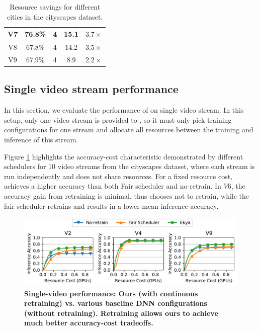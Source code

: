 \begin{table}[]
\begin{tabular}{|c|c|c|c|c|}
V7                                                                      & 76.8\%                    & 4           & 15.1                 & $3.7\times$                                                                 \\ \hline
V8                                                                      & 67.8\%                    & 4           & 14.2                 & $3.5\times$                                                                 \\ \hline
V9                                                                      & 67.9\%                    & 4           & 8.9                  & $2.2\times$                                                                 \\ \hline
\end{tabular}
\label{tab:resource-savings}
\caption{Resource savings for different cities in the cityscapes dataset.}
\end{table}

\subsection{Single video stream performance}
In this section, we evaluate the performance of \name{} on single video stream. In this setup, only one video stream is provided to \name{}, so it must only pick training configurations for one stream and allocate all resources between the training and inference of this stream. 

Figure \ref{fig:single-tradeoffs} highlights the accuracy-cost characteristic demonstrated by different schedulers for 10 video streams from the cityscapes dataset, where each stream is run independently and does not share resources. For a fixed resource cost, \name{} achieves a higher accuracy than both Fair scheduler and no-retrain.  In $V6$, the accuracy gain from retraining is minimal, thus \name{} chooses not to retrain, while the fair scheduler retrains and results in a lower mean inference accuracy.

\begin{figure}
 	\includegraphics[width=\linewidth]{results/singlecam/singlecam_acc_vs_cost_cityscapes.pdf}
	\caption{\small \bf Single-video performance: Ours (with continuous retraining) vs. various baseline DNN configurations (without retraining). Retraining allows ours to achieve much better accuracy-cost tradeoffs.}
	\label{fig:single-tradeoffs}
\end{figure}


